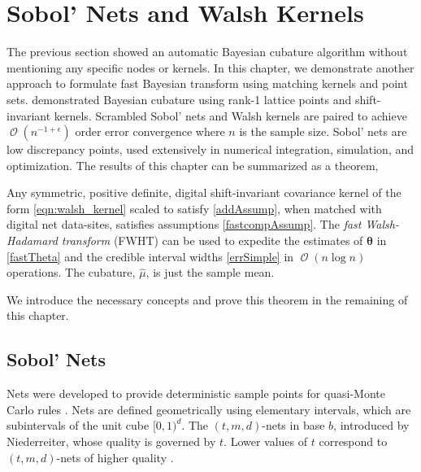 \documentclass{svjour3}                     %
\DeclareMathOperator{\Order}{{\mathcal O}}
\newcommand{\bm}[1]{\boldsymbol{#1}}
\newcommand{\vtheta}{{\bm{\theta}}}
\newcommand{\hmu}{\widehat{\mu}}
\begin{document}
 

\section{Sobol' Nets and Walsh Kernels}
\label{sec:sobol_walsh}



The previous section showed an automatic Bayesian cubature algorithm without mentioning any specific nodes or kernels. 
In this chapter, we demonstrate another approach to formulate fast Bayesian transform using matching kernels and point sets. 
\cite{JagHic19a} demonstrated Bayesian cubature using rank-1 lattice points and shift-invariant kernels.
Scrambled Sobol' nets and Walsh kernels are paired to achieve $\Order(n^{-1 + \epsilon})$ order error convergence where $n$ is the sample size. 
Sobol' nets \cite{Sob67} are low discrepancy points, used extensively in numerical integration, simulation, and optimization. 
The results of this chapter can be summarized as a theorem,



\begin{theorem}
	Any symmetric, positive definite, digital shift-invariant covariance kernel of the form \eqref{eqn:walsh_kernel} scaled to satisfy \eqref{addAssump}, when matched with digital net data-sites, satisfies assumptions \eqref{fastcompAssump}.  The \emph{fast Walsh-Hadamard transform} (FWHT) can be used to expedite the estimates of $\vtheta$ in \eqref{fastTheta} and the credible interval widths \eqref{errSimple} in $\Order(n \log n)$ operations. The cubature, $\hmu$, is just the sample mean.
\end{theorem}
We introduce the necessary concepts and prove this theorem in the remaining of this chapter.

\subsection{Sobol' Nets}


Nets were developed to provide deterministic sample points for quasi-Monte Carlo rules \cite{Nie05a}. Nets are defined geometrically using elementary intervals, which are subintervals of the unit cube $[0,1)^d$.
The $(t,m, d)$-nets in base $b$, introduced by Niederreiter, 
whose quality is governed by $t$. Lower values of $t$ correspond to $(t,m, d)$-nets of higher quality \cite{Bald10a}.
\end{document}
